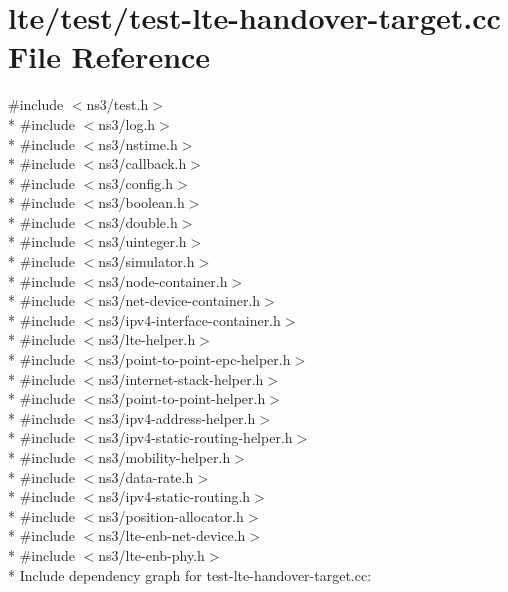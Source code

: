 \hypertarget{test-lte-handover-target_8cc}{}\section{lte/test/test-\/lte-\/handover-\/target.cc File Reference}
\label{test-lte-handover-target_8cc}
{\ttfamily \#include $<$ns3/test.\+h$>$}\\*
{\ttfamily \#include $<$ns3/log.\+h$>$}\\*
{\ttfamily \#include $<$ns3/nstime.\+h$>$}\\*
{\ttfamily \#include $<$ns3/callback.\+h$>$}\\*
{\ttfamily \#include $<$ns3/config.\+h$>$}\\*
{\ttfamily \#include $<$ns3/boolean.\+h$>$}\\*
{\ttfamily \#include $<$ns3/double.\+h$>$}\\*
{\ttfamily \#include $<$ns3/uinteger.\+h$>$}\\*
{\ttfamily \#include $<$ns3/simulator.\+h$>$}\\*
{\ttfamily \#include $<$ns3/node-\/container.\+h$>$}\\*
{\ttfamily \#include $<$ns3/net-\/device-\/container.\+h$>$}\\*
{\ttfamily \#include $<$ns3/ipv4-\/interface-\/container.\+h$>$}\\*
{\ttfamily \#include $<$ns3/lte-\/helper.\+h$>$}\\*
{\ttfamily \#include $<$ns3/point-\/to-\/point-\/epc-\/helper.\+h$>$}\\*
{\ttfamily \#include $<$ns3/internet-\/stack-\/helper.\+h$>$}\\*
{\ttfamily \#include $<$ns3/point-\/to-\/point-\/helper.\+h$>$}\\*
{\ttfamily \#include $<$ns3/ipv4-\/address-\/helper.\+h$>$}\\*
{\ttfamily \#include $<$ns3/ipv4-\/static-\/routing-\/helper.\+h$>$}\\*
{\ttfamily \#include $<$ns3/mobility-\/helper.\+h$>$}\\*
{\ttfamily \#include $<$ns3/data-\/rate.\+h$>$}\\*
{\ttfamily \#include $<$ns3/ipv4-\/static-\/routing.\+h$>$}\\*
{\ttfamily \#include $<$ns3/position-\/allocator.\+h$>$}\\*
{\ttfamily \#include $<$ns3/lte-\/enb-\/net-\/device.\+h$>$}\\*
{\ttfamily \#include $<$ns3/lte-\/enb-\/phy.\+h$>$}\\*
Include dependency graph for test-\/lte-\/handover-\/target.cc\+:
